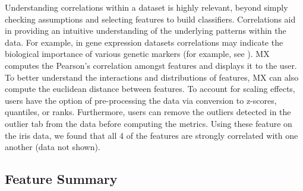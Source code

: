 \documentclass{article}
\begin{document}
Understanding correlations within a dataset is highly relevant, beyond simply checking assumptions and selecting features to build classifiers. Correlations aid in providing an intuitive understanding of the underlying patterns within the data. For example, in gene expression datasets correlations may indicate the biological importance of various genetic markers (for example, see \cite{shi2012unsupervised}). MX computes the Pearson's correlation amongst features and displays it to the user. To better understand the interactions and distributions of features, MX can also compute the euclidean distance between features. To account for scaling effects, users have the option of pre-processing the data via conversion to z-scores, quantiles, or ranks. Furthermore, users can remove the outliers detected in the outlier tab from the data before computing the metrics. Using these feature on the iris data, we found that all 4 of the features are strongly correlated with one another (data not shown).

\subsection{Feature Summary}
\label{subsec:SubSecFeature}
\end{document}
